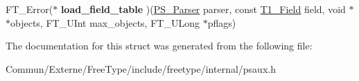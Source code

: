 \begin{DoxyCompactItemize}
\item 
F\+T\+\_\+\+Error($\ast$ {\bfseries load\+\_\+field\+\_\+table} )(\hyperlink{struct_p_s___parser_rec__}{P\+S\+\_\+\+Parser} parser, const \hyperlink{struct_t1___field_rec__}{T1\+\_\+\+Field} field, void $\ast$$\ast$objects, F\+T\+\_\+\+U\+Int max\+\_\+objects, F\+T\+\_\+\+U\+Long $\ast$pflags)\hypertarget{struct_p_s___parser___funcs_rec___a0952dd98193c4f73fe0a1281188ad395}{}\label{struct_p_s___parser___funcs_rec___a0952dd98193c4f73fe0a1281188ad395}

\end{DoxyCompactItemize}


The documentation for this struct was generated from the following file\+:\begin{DoxyCompactItemize}
\item 
Commun/\+Externe/\+Free\+Type/include/freetype/internal/psaux.\+h\end{DoxyCompactItemize}
